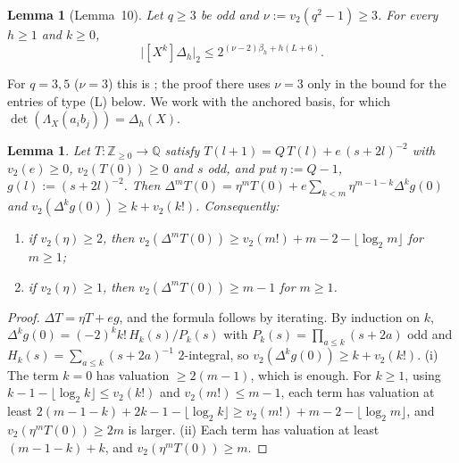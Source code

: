 \documentclass[11pt]{amsart}
\newtheorem{lemma}[theorem]{Lemma}
\theoremstyle{definition}
\theoremstyle{remark}
\numberwithin{equation}{section}
\newcommand{\ZZ}{\mathbb{Z}}
\newcommand{\QQ}{\mathbb{Q}}
\begin{document}
\begin{lemma}[Lemma~10]\label{lem:twoA}
Let $q\ge3$ be odd and $\nu:=v_2(q^2-1)\ge3$. For every $h\ge1$ and $k\ge0$,
\[
  \bigl|[X^k]\Delta_h\bigr|_2\le2^{(\nu-2)\beta_h+h(L+6)} .
\]
\end{lemma}

For $q=3,5$ ($\nu=3$) this is \cite[Lemma~5.3]{Chi2Paper}; the proof there uses $\nu=3$ only in the bound for the entries
of type (L) below. We work with the anchored basis, for which $\det(\Lambda_X(a_ib_j))=\Delta_h(X)$.

\begin{lemma}\label{lem:fdseq}
Let $T\colon\ZZ_{\ge0}\to\QQ$ satisfy $T(l+1)=Q\,T(l)+e\,(s+2l)^{-2}$ with $v_2(e)\ge0$, $v_2(T(0))\ge0$ and $s$ odd, and
put $\eta:=Q-1$, $g(l):=(s+2l)^{-2}$. Then $\Delta^mT(0)=\eta^mT(0)+e\sum_{k<m}\eta^{m-1-k}\Delta^kg(0)$ and
$v_2(\Delta^kg(0))\ge k+v_2(k!)$. Consequently:
\begin{enumerate}
\item if $v_2(\eta)\ge2$, then $v_2(\Delta^mT(0))\ge v_2(m!)+m-2-\lfloor\log_2m\rfloor$ for $m\ge1$;
\item if $v_2(\eta)\ge1$, then $v_2(\Delta^mT(0))\ge m-1$ for $m\ge1$.
\end{enumerate}
\end{lemma}

\begin{proof}
$\Delta T=\eta T+eg$, and the formula follows by iterating. By induction on $k$,
$\Delta^kg(0)=(-2)^kk!\,H_k(s)/P_k(s)$ with $P_k(s)=\prod_{a\le k}(s+2a)$ odd and $H_k(s)=\sum_{a\le k}(s+2a)^{-1}$
$2$-integral, so $v_2(\Delta^kg(0))\ge k+v_2(k!)$. (i) The term $k=0$ has valuation $\ge2(m-1)$, which is enough. For
$k\ge1$, using $k-1-\lfloor\log_2k\rfloor\le v_2(k!)$ and $v_2(m!)\le m-1$, each term has valuation at least $2(m-1-k)+2k-1-\lfloor\log_2k\rfloor\ge v_2(m!)+m-2-\lfloor\log_2m\rfloor$, and
$v_2(\eta^mT(0))\ge2m$ is larger. (ii) Each term has valuation at least $(m-1-k)+k$, and $v_2(\eta^mT(0))\ge m$.
\end{proof}
\end{document}
